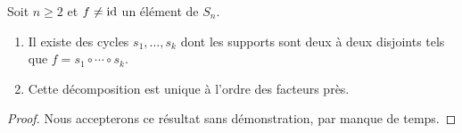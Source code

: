 \documentclass[french,course,oneside,theoremnosection]{lecture}
\newcommand{\supp}{\mathrm{supp}}
\begin{document}
\begin{theorem}
Soit $n \geq 2$ et $f\neq \operatorname{id}$ un élément de $S_n$. 
\begin{enumerate}
\item Il existe des cycles $s_1, \ldots, s_k$ dont les supports sont deux à deux disjoints tels que $f=s_1\circ \cdots \circ s_k$. 
\item Cette décomposition est unique à l'ordre des facteurs près.
\end{enumerate}
\end{theorem}
\begin{proof}
Nous accepterons ce résultat sans démonstration, par manque de temps.
\end{proof}
%
%
%
%
\end{document}
